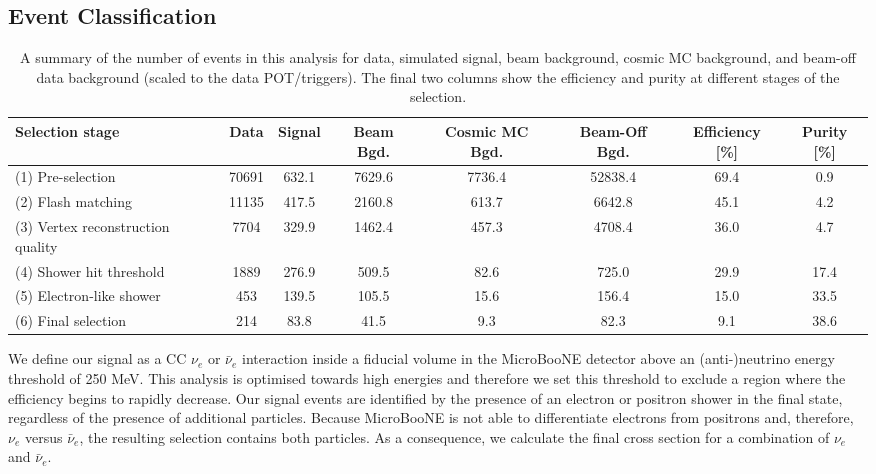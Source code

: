 \subsection{Event Classification}\label{event_classification}


\begin{table}[htbp!]
\caption{A summary of the number of events in this analysis for data, simulated signal, beam background, cosmic MC background, and beam-off data background (scaled to the data POT/triggers).  The final two columns show the efficiency and purity at different stages of the selection.\label{cutflowtab}}
\center
\begin{tabular}{l  c  c  c  c  c  c  c }
\hline
\hline
Selection stage & Data & Signal & Beam Bgd. & Cosmic MC Bgd. & Beam-Off Bgd. & Efficiency [\%] & Purity [\%]\\
\hline
(1) Pre-selection  & 70691 & 632.1 & 7629.6 & 7736.4 & 52838.4 & 69.4 & 0.9 \\
(2) Flash matching & 11135 & 417.5 & 2160.8 & 613.7 & 6642.8 & 45.1 & 4.2 \\
(3) Vertex reconstruction quality & 7704 & 329.9 & 1462.4 & 457.3 & 4708.4 & 36.0 & 4.7 \\
(4) Shower hit threshold & 1889 & 276.9 & 509.5 & 82.6 & 725.0 & 29.9 & 17.4 \\
(5) Electron-like shower & 453 & 139.5 & 105.5 & 15.6 & 156.4 & 15.0 & 33.5 \\
(6) Final selection & 214 & 83.8 & 41.5 & 9.3 & 82.3 & 9.1 & 38.6 \\
\hline
\hline
\end{tabular}
\label{cutflowtab}
\end{table}


We define our signal as a CC $\nu_e$ or $\bar{\nu}_e$ interaction inside a fiducial volume in the MicroBooNE detector above an (anti-)neutrino energy threshold of 250 MeV. This analysis is optimised towards high energies and therefore we set this threshold to exclude a region where the efficiency begins to rapidly decrease. Our signal events are identified by the presence of an electron or positron shower in the final state, regardless of the presence of additional particles. Because MicroBooNE is not able to differentiate electrons from positrons and, therefore, $\nu_e$ versus $\bar{\nu}_e$, the resulting selection contains both particles. As a consequence, we calculate the final cross section for a combination of $\nu_e$ and $\bar{\nu}_e$.

